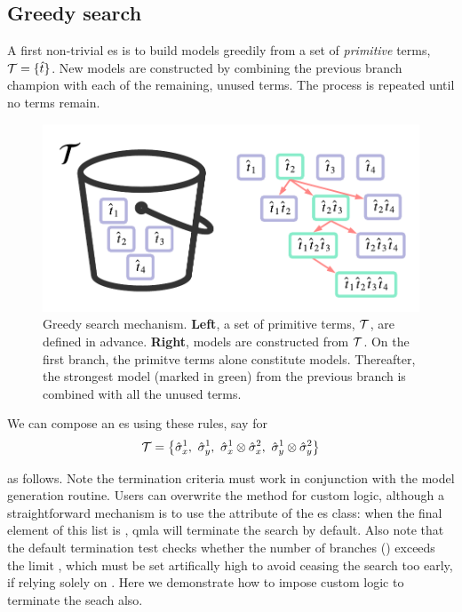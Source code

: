 \subsection{Greedy search}\label{sec:greedy_search}

A first non-trivial \gls{es} is to build models greedily from a set of \emph{primitive} terms, $\mathcal{T} = \{ \hat{t} \} $. 
New models are constructed by combining the previous branch champion with each of the remaining, unused terms. 
The process is repeated until no terms remain. 

\begin{figure}[H]
    \begin{center}
        \includegraphics[scale=0.75]{appendix/figures/greedy_exploration_strategy.pdf}
    \end{center}
    \caption[Greedy search mechanism]{
        Greedy search mechanism.
        \textbf{Left}, a set of primitive terms, $\mathcal{T}$, are defined in advance. 
        \textbf{Right}, models are constructed from $\mathcal{T}$. 
        On the first branch, the primitve terms alone constitute models. 
        Thereafter, the strongest model (marked in green) from the previous branch is combined with all the unused terms. 
    }
    \label{fig:greedy_exploration_strategy}
\end{figure}

We can compose an \gls{es} using these rules, say for 
\begin{equation*}
    \mathcal{T} = \left\{ \hat{\sigma}_{x}^1, \ \hat{\sigma}_{y}^1, \ \hat{\sigma}_{x}^1 \otimes \hat{\sigma}_{x}^2, \ \hat{\sigma}_{y}^1 \otimes \hat{\sigma}_{y}^2 \right\}
\end{equation*}

as follows.
Note the termination criteria must work in conjunction with the model generation routine. 
Users can overwrite the method  for custom logic, 
    although a straightforward mechanism is to use the  attribute of the \gls{es} class: 
    when the final element of this list is , \gls{qmla} will terminate the search by default. 
Also note that the default termination test checks whether the number of branches () exceeds the 
    limit , which must be set artifically high to avoid ceasing the search too early, 
    if relying solely on . 
Here we demonstrate how to impose custom logic to terminate the seach also. 

